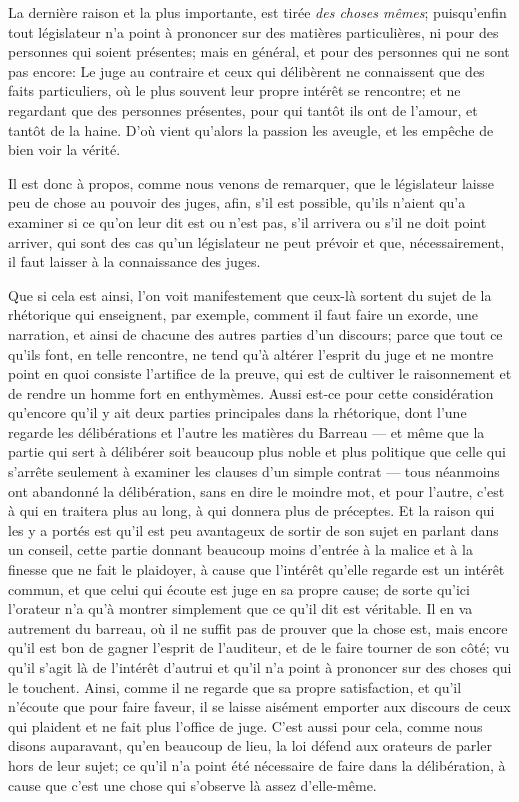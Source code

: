La dernière raison et la plus importante, est tirée \emph{des choses mêmes}; puisqu'enfin tout législateur n'a point à prononcer sur des
matières particulières, ni pour des personnes qui soient présentes; mais en général, et pour des personnes qui ne sont pas encore: Le juge
au contraire et ceux qui délibèrent ne connaissent que des faits  particuliers, où le plus souvent leur propre intérêt se rencontre; et ne
regardant que des personnes présentes, pour qui tantôt ils ont de l'amour, et tantôt de la haine. D'où vient qu'alors la passion les
aveugle, et les empêche de bien voir la vérité. 

Il est donc à propos, comme nous venons de remarquer, que le législateur laisse peu de chose au pouvoir des juges, afin, s'il est possible,
qu'ils n'aient qu'a examiner si ce qu'on leur dit est ou n'est pas, s'il arrivera ou s'il ne doit point arriver, qui sont des cas qu'un
législateur ne peut prévoir et que, nécessairement, il faut laisser à la connaissance des juges. 

\medbreak

Que si cela est ainsi, l'on voit manifestement que ceux-là sortent du sujet de la rhétorique qui enseignent, par exemple, comment il faut
faire un exorde, une narration, et ainsi de chacune des autres parties d'un discours; parce que tout ce qu'ils font, en telle rencontre, ne
tend qu'à altérer l'esprit du juge et ne montre point en quoi consiste l'artifice de la preuve, qui est de cultiver le raisonnement et
de rendre un homme fort en enthymèmes. Aussi est-ce pour cette considération qu'encore qu'il y ait deux parties principales dans la rhétorique,
dont l'une regarde les délibérations et l'autre les matières du Barreau --- et même que la partie qui sert à délibérer soit beaucoup plus noble
et plus politique que celle qui s'arrête seulement à examiner les clauses d'un simple contrat --- tous néanmoins ont abandonné la délibération,
sans en dire le moindre mot, et pour l'autre, c'est à qui en traitera plus au  long, à qui donnera plus de préceptes. Et la raison qui les
y a portés est qu'il est peu avantageux de sortir de son sujet en parlant dans un conseil, cette partie donnant beaucoup moins d'entrée à la
malice et à la finesse que ne fait le plaidoyer, à cause que l'intérêt qu'elle regarde est un intérêt commun, et que celui qui écoute est juge
en sa propre cause; de sorte qu'ici l'orateur n'a qu'à montrer simplement que ce qu'il dit est véritable. Il en va autrement du barreau, où il ne
suffit pas de prouver que la chose est, mais encore  qu'il est bon de gagner l'esprit de l'auditeur, et de le faire tourner de son côté; vu qu'il
s'agit là de l'intérêt d'autrui et qu'il n'a point à prononcer sur des choses qui le touchent. Ainsi, comme il ne regarde que sa propre
satisfaction, et qu'il n'écoute que pour faire faveur, il se laisse aisément emporter aux discours de ceux qui plaident et ne fait plus l'office
de juge. C'est aussi pour cela, comme nous disons auparavant, qu'en beaucoup de lieu, la loi défend aux orateurs de parler hors de leur sujet; ce
qu'il n'a point été nécessaire de faire dans la délibération, à cause que c'est une chose qui s'observe là assez d'elle-même.


